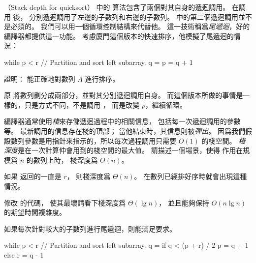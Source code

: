 \startPROBLEM
（Stack depth for quicksort）
 中的  算法包含了兩個對其自身的遞迴調用。
在調用  後，  分別遞迴調用了左邊的子數列和右邊的子數列。
  中的第二個遞迴調用並不是必須的。
我們可以用一個循環控制結構來代替他。
這一技術稱爲\emph{尾遞迴}，好的編譯器都提供這一功能。
考慮廈門這個版本的快速排序，他模擬了尾遞迴的情況：

\startCLRSCODE
while p < r
	// Partition and sort left subarray.
	q = 
	p = q + 1
\stopCLRSCODE

\startigBase[a]
\item 證明：  能正確地對數列 $A$ 進行排序。
\stopigBase

\startANSWER
原  將數列劃分成兩部分，並對其分別遞迴調用自身。
而這個版本所做的事情是一樣的，只是方式不同，不是調用 ，
而是改變 $p$，繼續循環。
\stopANSWER

編譯器通常使用\emph{棧}來存儲遞迴過程中的相關信息，
包括每一次遞迴調用的參數等。
最新調用的信息存在棧的頂部；
當他結束時，其信息則被\emph{彈出}。
因爲我們假設數列參數是用指針來指示的，所以每次過程調用只需要 $O(1)$ 的棧空間。
\emph{棧深度}是在一次計算仲會用到的棧空間的最大值。
\startigBase[a,continue]
\startitem
請描述一個場景，使得  作用在規模爲 $n$ 的數列上時，
棧深度爲 $\Theta(n)$。
\stopitem

\startANSWER
如果  返回的一直是 $r$，
則棧深度爲 $\Theta(n)$。
在數列已經排好序時就會出現這種情況。
\stopANSWER

\startitem
修改  的代碼，
使其最壞請看下棧深度爲 $\Theta(\lg{n})$，
並且能夠保持 $O(n\lg{n})$ 的期望時間複雜度。
\stopitem

\startANSWER
如果每次針對較大的子數列進行尾遞迴，則能滿足要求。

\startCLRSCODE
while p < r
	// Partition and sort left subarray.
	q = 
	if q < (p + r) / 2
		p = q + 1
	else
		r = q - 1
\stopCLRSCODE
\stopANSWER
\stopigBase
\stopPROBLEM
